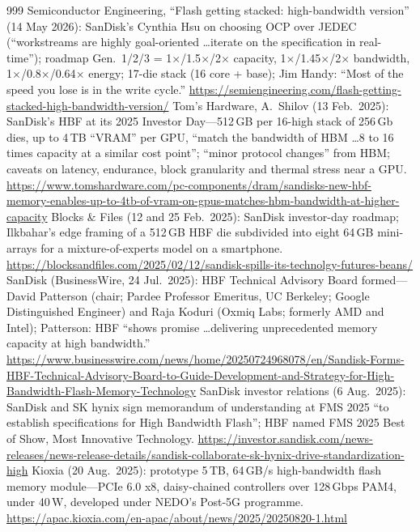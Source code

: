 \begin{thebibliography}{999}
 Semiconductor Engineering, ``Flash getting stacked: high-bandwidth version'' (14 May 2026): SanDisk's Cynthia Hsu on choosing OCP over JEDEC (``workstreams are highly goal-oriented \ldots iterate on the specification in real-time''); roadmap Gen.\ 1/2/3 = 1$\times$/1.5$\times$/2$\times$ capacity, 1$\times$/1.45$\times$/2$\times$ bandwidth, 1$\times$/0.8$\times$/0.64$\times$ energy; 17-die stack (16 core + base); Jim Handy: ``Most of the speed you lose is in the write cycle.'' \url{https://semiengineering.com/flash-getting-stacked-high-bandwidth-version/}
 Tom's Hardware, A.~Shilov (13 Feb.\ 2025): SanDisk's HBF at its 2025 Investor Day---512\,GB per 16-high stack of 256\,Gb dies, up to 4\,TB ``VRAM'' per GPU, ``match the bandwidth of HBM \ldots 8 to 16 times capacity at a similar cost point''; ``minor protocol changes'' from HBM; caveats on latency, endurance, block granularity and thermal stress near a GPU. \url{https://www.tomshardware.com/pc-components/dram/sandisks-new-hbf-memory-enables-up-to-4tb-of-vram-on-gpus-matches-hbm-bandwidth-at-higher-capacity}
 Blocks \& Files (12 and 25 Feb.\ 2025): SanDisk investor-day roadmap; Ilkbahar's edge framing of a 512\,GB HBF die subdivided into eight 64\,GB mini-arrays for a mixture-of-experts model on a smartphone. \url{https://blocksandfiles.com/2025/02/12/sandisk-spills-its-technolgy-futures-beans/}
 SanDisk (BusinessWire, 24 Jul.\ 2025): HBF Technical Advisory Board formed---David Patterson (chair; Pardee Professor Emeritus, UC Berkeley; Google Distinguished Engineer) and Raja Koduri (Oxmiq Labs; formerly AMD and Intel); Patterson: HBF ``shows promise \ldots delivering unprecedented memory capacity at high bandwidth.'' \url{https://www.businesswire.com/news/home/20250724968078/en/Sandisk-Forms-HBF-Technical-Advisory-Board-to-Guide-Development-and-Strategy-for-High-Bandwidth-Flash-Memory-Technology}
 SanDisk investor relations (6 Aug.\ 2025): SanDisk and SK hynix sign memorandum of understanding at FMS 2025 ``to establish specifications for High Bandwidth Flash''; HBF named FMS 2025 Best of Show, Most Innovative Technology. \url{https://investor.sandisk.com/news-releases/news-release-details/sandisk-collaborate-sk-hynix-drive-standardization-high}
 Kioxia (20 Aug.\ 2025): prototype 5\,TB, 64\,GB/s high-bandwidth flash memory module---PCIe 6.0 x8, daisy-chained controllers over 128\,Gbps PAM4, under 40\,W, developed under NEDO's Post-5G programme. \url{https://apac.kioxia.com/en-apac/about/news/2025/20250820-1.html}

\end{thebibliography}
